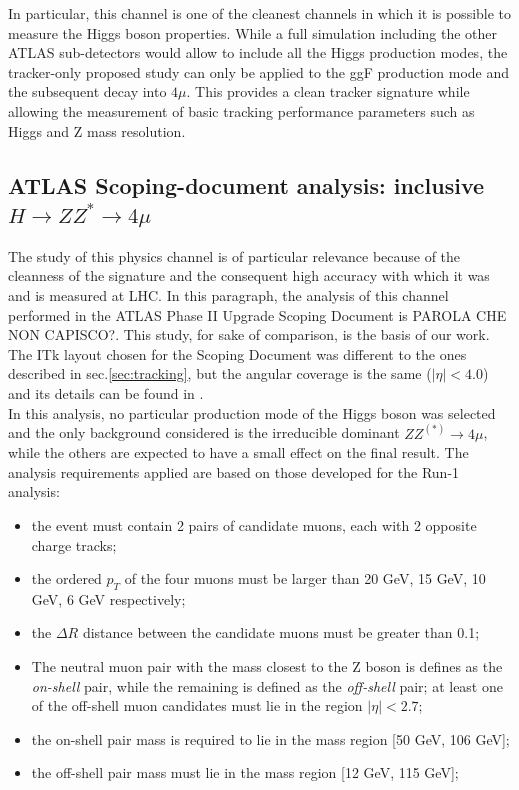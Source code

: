 \documentclass[a4paper,twoside,12pt]{article}
\begin{document}
In particular, this channel is one of the cleanest channels in which it is possible to measure the Higgs boson properties. While a full 
simulation including the other ATLAS sub-detectors would allow to include all the Higgs
production modes, the tracker-only proposed study can only
be applied to the ggF production mode and the subsequent decay into $4\mu$. This provides a clean tracker signature while
allowing the measurement of basic tracking performance parameters such as Higgs and Z mass resolution.

\subsection{ATLAS Scoping-document analysis: inclusive $H \rightarrow ZZ^* \rightarrow 4\mu$}\label{subsec:physics:scoping}
The study of this physics channel is of particular relevance because of the cleanness of the signature and the consequent high accuracy with which it was and is measured at LHC. In this paragraph, the analysis of this channel performed in the ATLAS Phase II Upgrade
Scoping Document\cite{scoping} is PAROLA CHE NON CAPISCO?. This study, for sake of comparison, is the basis of our work.\\

The ITk layout chosen for the Scoping Document was different to the ones described in sec.\ref{sec:tracking}, but the angular coverage is the same ($|\eta| < 4.0$) and its details
can be found in \cite{scoping}.\\

In this analysis, no particular production mode of the Higgs boson was selected and the only background considered is the irreducible dominant $ZZ^{(*)} \rightarrow 4\mu$, while the others are
expected to have a small effect on the final result. The analysis requirements applied are based on those developed for the Run-1 analysis:

\begin{itemize}
\item the event must contain 2 pairs of candidate muons, each with 2
opposite charge tracks;
\item the ordered $p_T$ of the four muons must be larger than 20 GeV, 15 GeV, 10 GeV, 6 GeV respectively;
\item the $\Delta R$ distance between the candidate muons must be greater than 0.1;
\item The neutral muon pair with the mass closest to the Z boson is defines as the \textit{on-shell} pair, while the remaining is defined as the \textit{off-shell} pair;
 at least one of the off-shell muon candidates must lie in the
region $|\eta| < 2.7$;	
\item the on-shell pair mass is required to lie in the mass region [50 GeV, 106 GeV];
\item the off-shell pair mass must lie in the mass region [12 GeV, 115 GeV];
\end{itemize}
\end{document}
